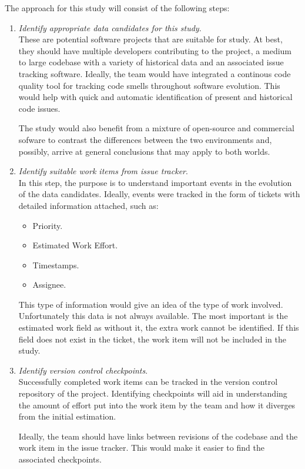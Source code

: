 \documentclass{mprop}
\begin{document}
The approach for this study will consist of the following steps:
\begin{enumerate}
	\item \textit{Identify appropriate data candidates for this study}.\\
	These are potential software projects that are suitable for study. At best,
	they should have multiple developers contributing to the project, a medium
	to large codebase with a variety of historical data and an associated issue
	tracking software. Ideally, the team would have integrated a continous code
	quality tool for tracking code smells throughout software evolution. This
	would help with quick and automatic identification of present and historical
	code issues. 
	
	The study would also benefit from a mixture of open-source and
	commercial sofware to contrast the differences between the two environments
	and, possibly, arrive at general conclusions that may apply to both worlds.

	\item \textit{Identify suitable work items from issue tracker}.\\
	In this step, the purpose is to understand important events in the evolution
	of the data candidates. Ideally, events were tracked in the form of tickets
	with detailed information attached, such as:
	\begin{itemize}
		\item Priority. 
		\item Estimated Work Effort.
		\item Timestamps.
		\item Assignee.  
	\end{itemize}

	This type of information would give an idea of the type of work involved.
	Unfortunately this data is not always available. The most important is the
	estimated work field as without it, the extra work cannot be identified. If
	this field does not exist in the ticket, the work item will not be included
	in the study.

	\item \textit{Identify version control checkpoints}.\\
	Successfully completed work items can be tracked in the version control
	repository of the project. Identifying checkpoints will aid in understanding
	the amount of effort put into the work item by the team and how it diverges
	from the initial estimation. 

	Ideally, the team should have links between revisions of the codebase and
	the work item in the issue tracker. This would make it easier to find the
	associated checkpoints.


\end{enumerate}
\end{document}
